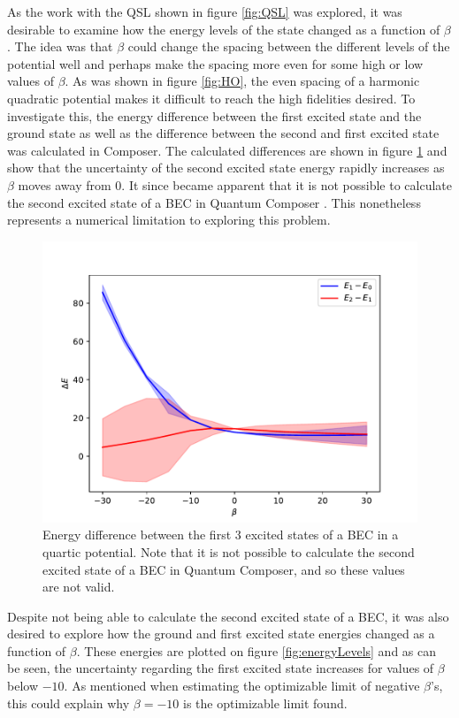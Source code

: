 \documentclass[aps,pra,reprint,superscriptaddress]{revtex4-1}
\begin{document}
As the work with the QSL shown in figure \ref{fig:QSL} was explored, it was desirable to examine how the energy levels of the state changed as a function of $\beta$. The idea was that $\beta$ could change the spacing between the different levels of the potential well and perhaps make the spacing more even for some high or low values of $\beta$. As was shown in figure \ref{fig:HO}, the even spacing of a harmonic quadratic potential makes it difficult to reach the high fidelities desired. To investigate this, the energy difference between the first excited state and the ground state as well as the difference between the second and first excited state was calculated in Composer. The calculated differences are shown in figure \ref{fig:energyDiff} and show that the uncertainty of the second excited state energy rapidly increases as $\beta$ moves away from $0$. It since became apparent that it is not possible to calculate the second excited state of a BEC in Quantum Composer \cite{QEngine}. This nonetheless represents a numerical limitation to exploring this problem. \\

\begin{figure}
	\includegraphics[width=\columnwidth]{graphics/Energydifference.pdf}
	\caption{Energy difference between the first 3 excited states of a BEC in a quartic potential. Note that it is not possible to calculate the second excited state of a BEC in Quantum Composer, and so these values are not valid.}
	\label{fig:energyDiff}
\end{figure}

Despite not being able to calculate the second excited state of a BEC, it was also desired to explore how the ground and first excited state energies changed as a function of $\beta$. These energies are plotted on figure \ref{fig:energyLevels} and as can be seen, the uncertainty regarding the first excited state increases for values of $\beta$ below $-10$. As mentioned when estimating the optimizable limit of negative $\beta$'s, this could explain why $\beta=-10$ is the optimizable limit found.\\
\end{document}
